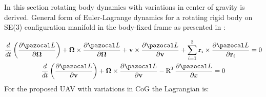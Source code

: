 In this section rotating body dynamics with variations in center of gravity is derived.
General form of Euler-Lagrange dynamics for a rotating rigid body on SE(3) configuration manifold in the body-fixed frame as presented in \cite{LeeModel}:

\begin{gather}
	\frac{d}{dt} \left( \frac{\partial \La}{\partial \mb{\Omega}} \right)
	+ \mb{\Omega} \times \frac{\partial \La}{\partial \mb{\Omega}} 
	+ \textbf{v} \times \frac{\partial \La}{\partial \textbf{v}} 
	+ \sum_{i=1}^{3} \textbf{r}_i \times \frac{\partial \La}{\partial \textbf{r}_i} = 0 \label{general1}\\
	\frac{d}{dt} \left( \frac{\partial \La}{\partial \textbf{v}} \right)
	+ \mb{\Omega} \times \frac{\partial \La}{\partial \textbf{v}} 
	- \text{R}^T \frac{\partial \La}{\partial x} = 0 \label{general2}
\end{gather}
For the proposed UAV with variations in CoG the Lagrangian is:

